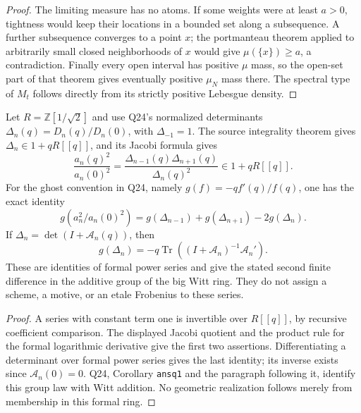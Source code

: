 \begin{proof}
The limiting measure has no atoms.  If some weights were at least
\(a>0\), tightness would keep their locations in a bounded set along
a subsequence.  A further subsequence converges to a point \(x\);
the portmanteau theorem applied to arbitrarily small closed
neighborhoods of \(x\) would give \(\mu(\{x\})\geq a\), a
contradiction.  Finally every open interval has positive \(\mu\)
mass, so the open-set part of that theorem gives eventually positive
\(\mu_N\) mass there.  The spectral type of \(M_t\) follows directly
from its strictly positive Lebesgue density.
\end{proof}

\begin{proposition}
\label{AC-S15}
Let \(R=\mathbb Z[1/\sqrt2]\) and use Q24's normalized determinants
\(\Delta_n(q)=D_n(q)/D_n(0)\), with \(\Delta_{-1}=1\).
The source integrality theorem gives
\(\Delta_n\in1+qR[[q]]\), and its Jacobi formula gives
\[
 \frac{a_n(q)^2}{a_n(0)^2}
   =\frac{\Delta_{n-1}(q)\Delta_{n+1}(q)}{\Delta_n(q)^2}
      \in1+qR[[q]].
\]
For the ghost convention in Q24, namely
\(g(f)=-qf'(q)/f(q)\), one has the exact identity
\[
 g\!\left(a_n^2/a_n(0)^2\right)
        =g(\Delta_{n-1})+g(\Delta_{n+1})-2g(\Delta_n).
\]
If \(\Delta_n=\det(I+\mathcal A_n(q))\), then
\[
 g(\Delta_n)=-q\operatorname{Tr}
          ((I+\mathcal A_n)^{-1}\mathcal A_n').
\]
These are identities of formal power series and give the stated
second finite difference in the additive group of the big Witt ring.
They do not assign a scheme, a motive, or an etale Frobenius to these
series.
\end{proposition}
\begin{proof}
A series with constant term one is invertible over \(R[[q]]\),
by recursive coefficient comparison.  The displayed Jacobi quotient
and the product rule for the formal logarithmic derivative give the
first two assertions.  Differentiating a determinant over formal
power series gives the last identity; its inverse exists since
\(\mathcal A_n(0)=0\).  Q24, Corollary \texttt{ansq1} and the
paragraph following it, identify this group law with Witt addition.
No geometric realization follows merely from membership in this
formal ring.
\end{proof}

